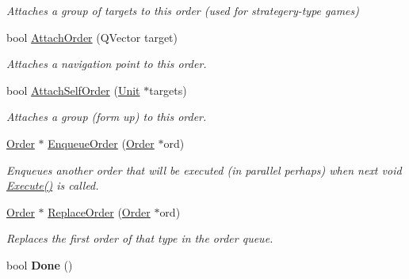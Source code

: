 \begin{DoxyCompactItemize}
\begin{DoxyCompactList}\small\item\em Attaches a group of targets to this order (used for strategery-\/type games) \end{DoxyCompactList}\item 
bool \hyperlink{classOrder_a52251564ef45c20c2495a9157a986764}{Attach\+Order} (Q\+Vector target)\hypertarget{classOrder_a52251564ef45c20c2495a9157a986764}{}\label{classOrder_a52251564ef45c20c2495a9157a986764}

\begin{DoxyCompactList}\small\item\em Attaches a navigation point to this order. \end{DoxyCompactList}\item 
bool \hyperlink{classOrder_a51a620970adb996b52659848e121eb37}{Attach\+Self\+Order} (\hyperlink{classUnit}{Unit} $\ast$targets)\hypertarget{classOrder_a51a620970adb996b52659848e121eb37}{}\label{classOrder_a51a620970adb996b52659848e121eb37}

\begin{DoxyCompactList}\small\item\em Attaches a group (form up) to this order. \end{DoxyCompactList}\item 
\hyperlink{classOrder}{Order} $\ast$ \hyperlink{classOrder_a904c86a9f67cb49d4a84514f75d861f2}{Enqueue\+Order} (\hyperlink{classOrder}{Order} $\ast$ord)\hypertarget{classOrder_a904c86a9f67cb49d4a84514f75d861f2}{}\label{classOrder_a904c86a9f67cb49d4a84514f75d861f2}

\begin{DoxyCompactList}\small\item\em Enqueues another order that will be executed (in parallel perhaps) when next void \hyperlink{classOrder_abcab68df8e1fdb17cad57307cea7966f}{Execute()} is called. \end{DoxyCompactList}\item 
\hyperlink{classOrder}{Order} $\ast$ \hyperlink{classOrder_a948afe3ce512837ab89a014953de843d}{Replace\+Order} (\hyperlink{classOrder}{Order} $\ast$ord)\hypertarget{classOrder_a948afe3ce512837ab89a014953de843d}{}\label{classOrder_a948afe3ce512837ab89a014953de843d}

\begin{DoxyCompactList}\small\item\em Replaces the first order of that type in the order queue. \end{DoxyCompactList}\item 
bool {\bfseries Done} ()\hypertarget{classOrder_ac6c566229592abf91060681c2392e3d2}{}\label{classOrder_ac6c566229592abf91060681c2392e3d2}


\end{DoxyCompactItemize}
